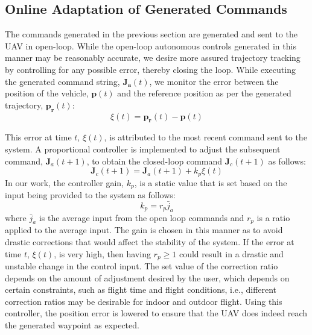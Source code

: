 \documentclass[letterpaper, 10 pt, conference]{ieeeconf}  %
\newcommand\NB[1]{$\spadesuit$\footnote{NB: #1}}
\begin{document}
\subsection{Online Adaptation of Generated Commands} \label{sec:adapt}

The commands generated in the previous section are generated and sent to the UAV in open-loop. While the open-loop autonomous controls generated in this manner may be reasonably accurate, we desire more assured trajectory tracking by controlling for any possible error, thereby closing the loop. While executing the generated command string, $\bm{J_a}(t)$, we monitor the error between the position of the vehicle, $\bm{p}(t)$ and the reference position as per the generated trajectory, $\bm{p_r}(t)$:
\begin{equation}
    \xi(t) = \bm{p_r}(t)-\bm{p}(t)
\end{equation}

This error at time $t$, $\xi(t)$, is attributed to the most recent command sent to the system. A proportional controller is implemented to adjust the subsequent command, $\bm{J}_a(t+1)$, to obtain the closed-loop command $\bm{J}_c(t+1)$ as follows:
\begin{equation}
    \bm{J}_c(t+1) = \bm{J}_a(t+1) + k_p\xi(t)
\end{equation}
In our work, the controller gain, $k_p$, is a static value that is set based on the input being provided to the system as follows:
\begin{equation} \label{eq:ctrls}
    k_p = r_p\bar{j}_a
\end{equation}
where $\bar{j}_a$ is the average input from the open loop commands and $r_p$ is a ratio applied to the average input. The gain is chosen in this manner as to avoid drastic corrections that would affect the stability of the system. If the error at time $t$, $\xi(t)$, is very high, then having $r_p \geq 1$ could result in a drastic and unstable change in the control input. The set value of the correction ratio depends on the amount of adjustment desired by the user, which depends on certain constraints, such as flight time and flight conditions, i.e., different correction ratios may be desirable for indoor and outdoor flight. Using this controller, the position error is lowered to ensure that the UAV does indeed reach the generated waypoint as expected.  %
\end{document}
